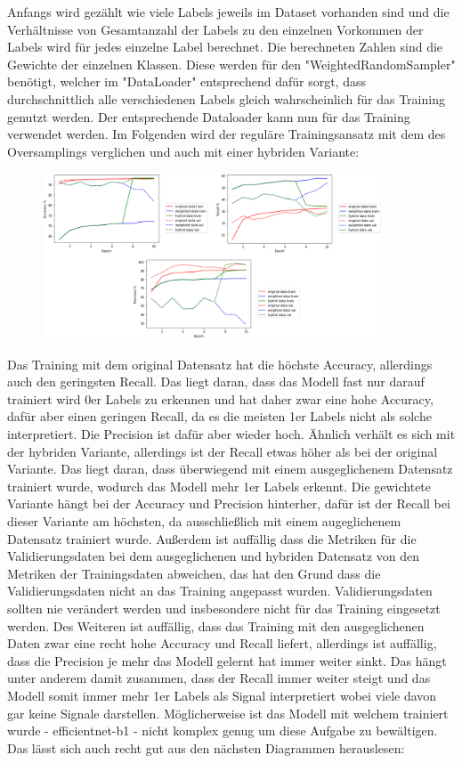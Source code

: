 \documentclass[11pt, a4paper]{article}
\begin{document}
Anfangs wird gezählt wie viele Labels jeweils im Dataset vorhanden sind und die Verhältnisse von Gesamtanzahl der Labels zu den einzelnen Vorkommen der Labels wird für jedes einzelne Label berechnet. Die berechneten Zahlen sind die Gewichte der einzelnen Klassen. Diese werden für den "WeightedRandomSampler" benötigt, welcher im "DataLoader" entsprechend dafür sorgt, dass durchschnittlich alle verschiedenen Labels gleich wahrscheinlich für das Training genutzt werden. Der entsprechende Dataloader kann nun für das Training verwendet werden. Im Folgenden wird der reguläre Trainingsansatz mit dem des Oversamplings verglichen und auch mit einer hybriden Variante:
\begin{figure}[h]
\centering
\includegraphics[width=0.9\textwidth]{metrics-acc-recall-prec.png}
\end{figure}
Das Training mit dem original Datensatz hat die höchste Accuracy, allerdings auch den geringsten Recall. Das liegt daran, dass das Modell fast nur darauf trainiert wird 0er Labels zu erkennen und hat daher zwar eine hohe Accuracy, dafür aber einen geringen Recall, da es die meisten 1er Labels nicht als solche interpretiert. Die Precision ist dafür aber wieder hoch. Ähnlich verhält es sich mit der hybriden Variante, allerdings ist der Recall etwas höher als bei der original Variante. Das liegt daran, dass überwiegend mit einem ausgeglichenem Datensatz trainiert wurde, wodurch das Modell mehr 1er Labels erkennt. Die gewichtete Variante hängt bei der Accuracy und Precision hinterher, dafür ist der Recall bei dieser Variante am höchsten, da ausschließlich mit einem augeglichenem Datensatz trainiert wurde. Außerdem ist auffällig dass die Metriken für die Validierungsdaten bei dem ausgeglichenen und hybriden Datensatz von den Metriken der Trainingsdaten abweichen, das hat den Grund dass die Validierungsdaten nicht an das Training angepasst wurden. Validierungsdaten sollten nie verändert werden und insbesondere nicht für das Training eingesetzt werden. Des Weiteren ist auffällig, dass das Training mit den ausgeglichenen Daten zwar eine recht hohe Accuracy und Recall liefert, allerdings ist auffällig, dass die Precision je mehr das Modell gelernt hat immer weiter sinkt. Das hängt unter anderem damit zusammen, dass der Recall immer weiter steigt und das Modell somit immer mehr 1er Labels als Signal interpretiert wobei viele davon gar keine Signale darstellen. Möglicherweise ist das Modell mit welchem trainiert wurde - efficientnet-b1 - nicht komplex genug um diese Aufgabe zu bewältigen. Das lässt sich auch recht gut aus den nächsten Diagrammen herauslesen:
\end{document}
